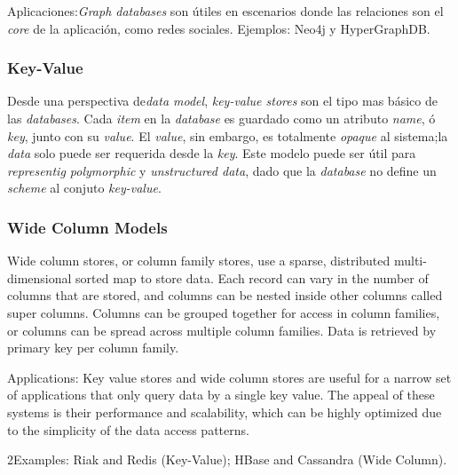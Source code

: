 Aplicaciones:\textit{Graph databases} son útiles en escenarios donde las relaciones son el \textit{core} de la aplicación, como redes sociales.
Ejemplos: Neo4j y HyperGraphDB.

\subsubsection*{Key-Value}

Desde una perspectiva de\textit{data model}, \textit{key-value stores} son el tipo mas básico de las \textit{ databases}. Cada \textit{item} en la \textit{database} es guardado como un atributo \textit{name}, ó \textit{key}, junto con su \textit{value}. El \textit{value}, sin embargo, es totalmente \textit{opaque} al sistema;la \textit{data} solo puede ser requerida desde la \textit{key}. Este modelo puede ser útil para \textit{representig polymorphic} y \textit{unstructured data}, dado que la \textit{database} no define un \textit{scheme} al conjuto \textit{key-value}.

\subsubsection*{Wide Column Models}

Wide column stores, or column family stores, use a sparse,
distributed multi-dimensional sorted map to store data. Each record can vary in the number of columns that are stored, and columns can be nested inside other columns called super columns. Columns can be grouped together for access in column families, or columns can be spread across multiple column families. Data is retrieved by primary key per column family.

Applications: Key value stores and wide column stores are useful for a narrow set of applications that only query data by a single key value. The appeal of these systems is their performance and scalability, which can be highly optimized due to the simplicity of the data access patterns.

2Examples: Riak and Redis (Key-Value); HBase and Cassandra (Wide Column).





